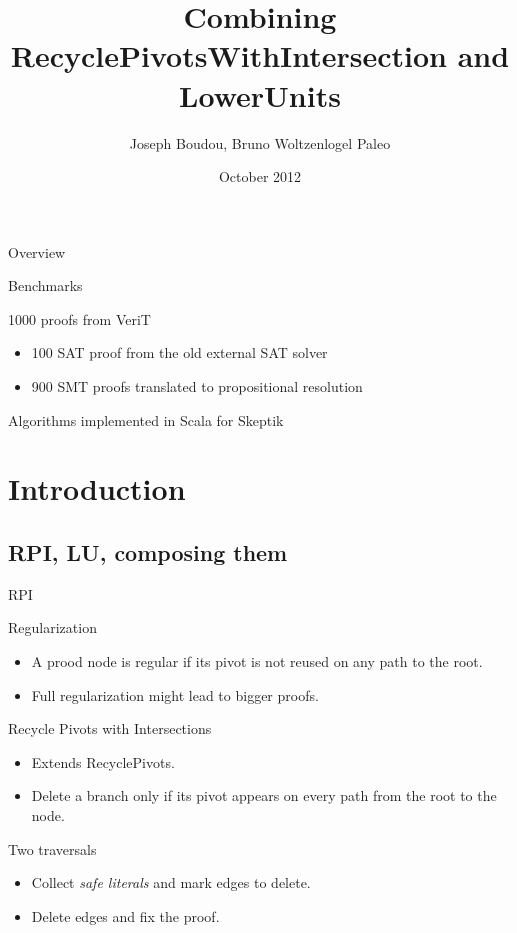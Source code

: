 \documentclass[compress]{beamer}
\title{Combining RecyclePivotsWithIntersection and LowerUnits}
\author[Joseph Boudou]{Joseph Boudou, Bruno Woltzenlogel Paleo}
\newenvironment{subpart}[1]
{ \begin{block}{#1}
  \begin{itemize}
}{
  \end{itemize}
  \end{block}
}
\begin{document}

\begin{frame}
\date{October 2012}
\titlepage
\end{frame}

\begin{frame}{Overview}
\tableofcontents
\end{frame}

\begin{frame}{Benchmarks}
  \begin{subpart}{1000 proofs from VeriT}
    \item 100 SAT proof from the old external SAT solver
    \item 900 SMT proofs translated to propositional resolution
  \end{subpart}
  \begin{block}{Algorithms implemented in Scala for Skeptik}
  \end{block}
\end{frame}

\section{Introduction}
\subsection{RPI, LU, composing them}

\begin{frame}{RPI}
  \begin{subpart}{Regularization}
    \item A prood node is regular if its pivot is not reused on any path to the root.
    \item Full regularization might lead to bigger proofs.
  \end{subpart}
  \begin{subpart}{Recycle Pivots with Intersections}
    \item Extends RecyclePivots.
    \item Delete a branch only if its pivot appears on every path from the root to the node.
  \end{subpart}
  \begin{subpart}{Two traversals}
    \item Collect \emph{safe literals} and mark edges to delete.
    \item Delete edges and fix the proof.
  \end{subpart}
\end{frame}
\end{document}
